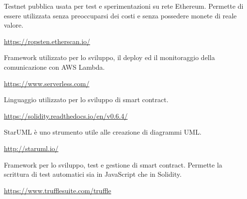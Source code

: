 	Testnet pubblica usata per test e sperimentazioni su rete Ethereum. Permette di essere utilizzata senza preoccuparsi dei costi e senza possedere monete di reale valore.
	\begin{center}
		\url{https://ropsten.etherscan.io/}
	\end{center}

	Framework utilizzato per lo sviluppo, il deploy ed il monitoraggio della comunicazione con AWS Lambda.
	\begin{center}
		\url{https://www.serverless.com/}
	\end{center}

	Linguaggio utilizzato per lo sviluppo di smart contract.
	\begin{center}
		\url{https://solidity.readthedocs.io/en/v0.6.4/}
	\end{center}

	StarUML è uno strumento utile alle creazione di diagrammi UML.
	\begin{center}
		\url{http://staruml.io/}
	\end{center}

	Framework per lo sviluppo, test e gestione di smart contract. Permette la scrittura di test automatici sia in JavaScript che in Solidity.
	\begin{center}
		\url{https://www.trufflesuite.com/truffle}
	\end{center}

